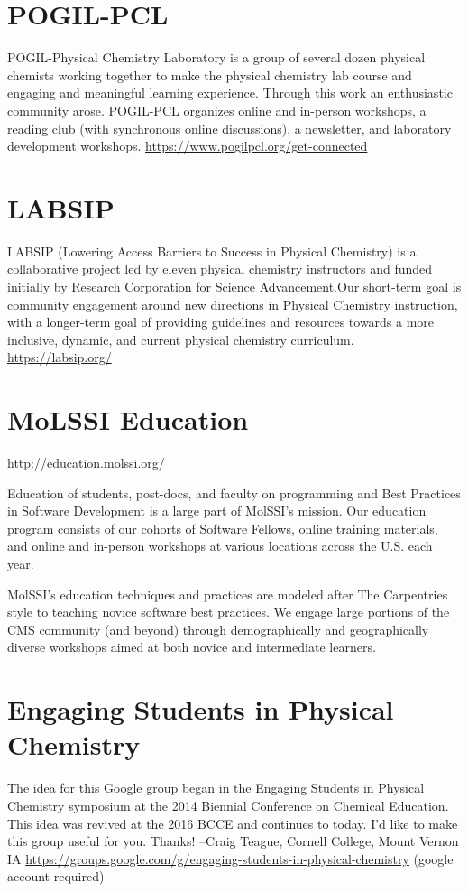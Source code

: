 \documentclass[11pt]{article}
\date{\today}
\title{}
\begin{document}
\section*{POGIL-PCL}
\label{sec:org3b2ae79}
POGIL-Physical Chemistry Laboratory is a group of several dozen physical chemists working together to make the physical chemistry lab course and engaging and meaningful learning experience. Through this work an enthusiastic community arose. POGIL-PCL organizes online and in-person workshops, a reading club (with synchronous online discussions), a newsletter, and laboratory development workshops. \url{https://www.pogilpcl.org/get-connected}

\section*{LABSIP}
\label{sec:orge27f2b9}
LABSIP (Lowering Access Barriers to Success in Physical Chemistry) is a collaborative
project led by eleven physical chemistry instructors and funded initially by Research Corporation for Science Advancement.Our short-term goal is community engagement around new directions in Physical Chemistry instruction, with a longer-term goal of providing guidelines and resources towards a more inclusive, dynamic, and current physical chemistry curriculum.
\url{https://labsip.org/}

\section*{MoLSSI Education}
\label{sec:org7842083}
\url{http://education.molssi.org/}

Education of students, post-docs, and faculty on programming and Best Practices in Software Development is a large part of MolSSI's mission. Our education program consists of our cohorts of Software Fellows, online training materials, and online and in-person workshops at various locations across the U.S. each year.

MolSSI’s education techniques and practices are modeled after The Carpentries style to teaching novice software best practices. We engage large portions of the CMS community (and beyond) through demographically and geographically diverse workshops aimed at both novice and intermediate learners.


\section*{Engaging Students in Physical Chemistry}
\label{sec:org690c970}
The idea for this Google group began in the Engaging Students in Physical Chemistry symposium at the 2014 Biennial Conference on Chemical Education.  This idea was revived at the 2016 BCCE and continues to today.  I'd like to make this group useful for you.  Thanks!  --Craig Teague, Cornell College, Mount Vernon IA
\url{https://groups.google.com/g/engaging-students-in-physical-chemistry} (google account required)
\end{document}
